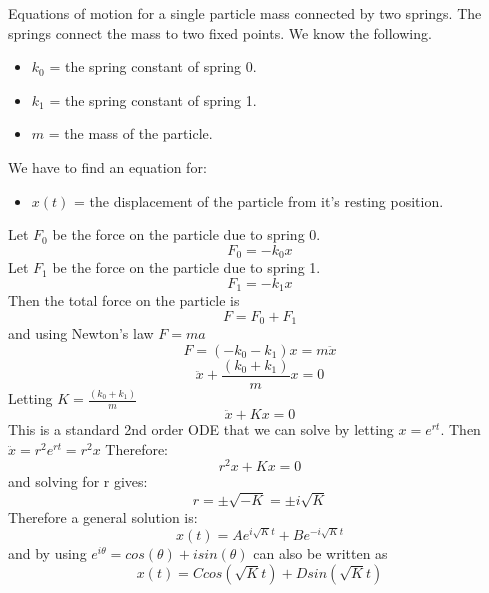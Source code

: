 \documentclass{article}
\begin{document}
Equations of motion for a single particle mass connected by two springs. The springs connect the mass to 
two fixed points. We know the following.
\begin{itemize}
\item $k_{0}$ = the spring constant of spring 0.
\item $k_{1}$ = the spring constant of spring 1.
\item $m$ = the mass of the particle.
\end{itemize}
We have to find an equation for:
\begin{itemize}
\item $x(t)$ = the displacement of the particle from it's resting position.
\end{itemize}
Let $F_{0}$ be the force on the particle due to spring 0.
\begin{equation}
	F_{0} = -k_{0}x
\end{equation}
Let $F_{1}$ be the force on the particle due to spring 1.
\begin{equation}
	F_{1} = -k_{1}x
\end{equation}
Then the total force on the particle is
\begin{equation}
	F = F_{0} + F_{1}
\end{equation}
and using Newton's law $F = ma$
\[F = (-k_{0} - k_{1})x = m\ddot{x}	\]
\[\ddot{x} + \frac{(k_{0} + k_{1})}{m}x = 0\]
Letting $K = \frac{(k_{0} + k_{1})}{m}$
\begin{equation}
	\ddot{x} + Kx = 0
\end{equation}
This is a standard 2nd order ODE that we can solve by letting $x = e^{rt}$.
Then $\ddot{x} = r^{2}e^{rt} = r^{2}x$ Therefore:
\[
	r^{2}x + Kx = 0
\]
and solving for r gives:
\[r = \pm\sqrt{-K} = \pm i \sqrt{K}\]
Therefore a general solution is:
\begin{equation}
	x(t) = Ae^{i\sqrt{K}t} + Be^{-i\sqrt{K}t}	
\end{equation}
and by using $e^{i\theta} = cos(\theta) + isin(\theta)$ can also be written as
\begin{equation}
	x(t) = Ccos(\sqrt{K}t) + Dsin(\sqrt{K}t)
\end{equation}
\end{document}
